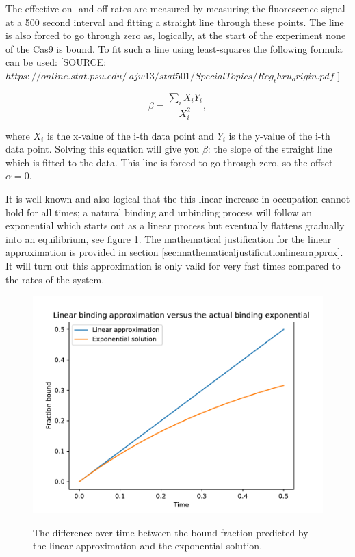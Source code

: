 The effective on- and off-rates are measured by measuring the fluorescence signal at a 500 second interval and fitting a straight line through these points. The line is also forced to go through zero as, logically, at the start of the experiment none of the Cas9 is bound. To fit such a line using least-squares the following formula can be used: [SOURCE: $https://online.stat.psu.edu/~ajw13/stat501/SpecialTopics/Reg_thru_origin.pdf$ ]

\begin{equation}
\beta = \frac{\sum_i X_iY_i}{X_i^2},
\label{eq:slopeleastsquares}
\end{equation}

where $X_i$ is the x-value of the i-th data point and $Y_i$ is the y-value of the i-th data point. Solving this equation will give you $\beta$: the slope of the straight line which is fitted to the data. This line is forced to go through zero, so the offset $\alpha = 0$.

It is well-known and also logical that the this linear increase in occupation cannot hold for all times; a natural binding and unbinding process will follow an exponential which starts out as a linear process but eventually flattens gradually into an equilibrium, see figure \ref{fig:linearvexponentialexample}. The mathematical justification for the linear approximation is provided in section \ref{sec:mathematicaljustificationlinearapprox}. It will turn out this approximation is only valid for very fast times compared to the rates of the system.


\begin{figure}[H]
\begin{center}
\includegraphics[width=\textwidth]{images/linearvexponentialexample}
\label{fig:linearvexponentialexample}
\caption{The difference over time between the bound fraction predicted by the linear approximation and the exponential solution. }
\end{center}
\end{figure}

